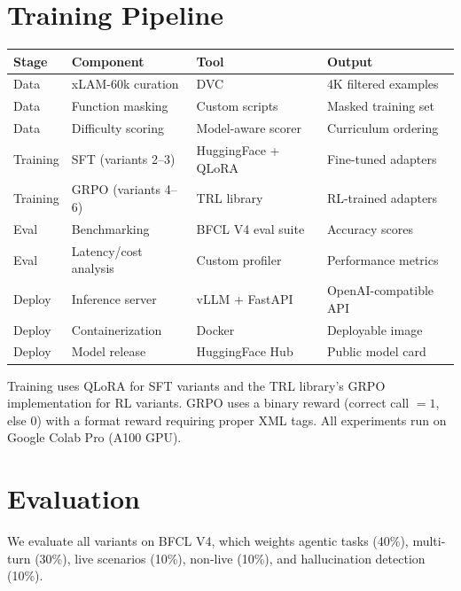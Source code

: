 \documentclass[11pt, letterpaper]{article}
\begin{document}
\section*{Training Pipeline}

\begin{table}[h]
\centering
\small
\begin{tabular}{@{}llll@{}}
\toprule
\textbf{Stage} & \textbf{Component} & \textbf{Tool} & \textbf{Output} \\
\midrule
Data & xLAM-60k curation & DVC & 4K filtered examples \\
Data & Function masking & Custom scripts & Masked training set \\
Data & Difficulty scoring & Model-aware scorer & Curriculum ordering \\
\midrule
Training & SFT (variants 2--3) & HuggingFace + QLoRA & Fine-tuned adapters \\
Training & GRPO (variants 4--6) & TRL library & RL-trained adapters \\
\midrule
Eval & Benchmarking & BFCL V4 eval suite & Accuracy scores \\
Eval & Latency/cost analysis & Custom profiler & Performance metrics \\
\midrule
Deploy & Inference server & vLLM + FastAPI & OpenAI-compatible API \\
Deploy & Containerization & Docker & Deployable image \\
Deploy & Model release & HuggingFace Hub & Public model card \\
\bottomrule
\end{tabular}
\end{table}

Training uses QLoRA for SFT variants and the TRL library's GRPO implementation for RL variants. GRPO uses a binary reward (correct call $= 1$, else $0$) with a format reward requiring proper XML tags. All experiments run on Google Colab Pro (A100 GPU).

\section*{Evaluation}

We evaluate all variants on BFCL V4, which weights agentic tasks (40\%), multi-turn (30\%), live scenarios (10\%), non-live (10\%), and hallucination detection (10\%).
\end{document}
